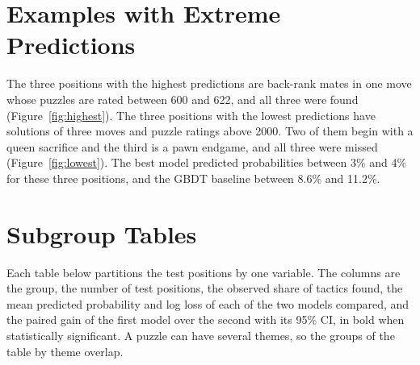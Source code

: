 \documentclass[11pt]{article}
\begin{document}
\section{Examples with Extreme Predictions}

The three positions with the highest predictions are back-rank mates in one
move whose puzzles are rated between 600 and 622, and all three were found
(Figure~\ref{fig:highest}). The three positions with the lowest predictions
have solutions of three moves and puzzle ratings above 2000. Two of them
begin with a queen sacrifice and the third is a pawn endgame, and all three
were missed (Figure~\ref{fig:lowest}). The best model predicted
probabilities between 3\% and 4\% for these three positions, and the GBDT
baseline between 8.6\% and 11.2\%.



\section{Subgroup Tables}

Each table below partitions the test positions by one variable. The columns
are the group, the number of test positions, the observed share of tactics
found, the mean predicted probability and log loss of each of the two models
compared, and the paired gain of the first model over the second with its
95\% CI, in bold when statistically significant. A puzzle can have several
themes, so the groups of the table by theme overlap.

\fi
\end{document}
